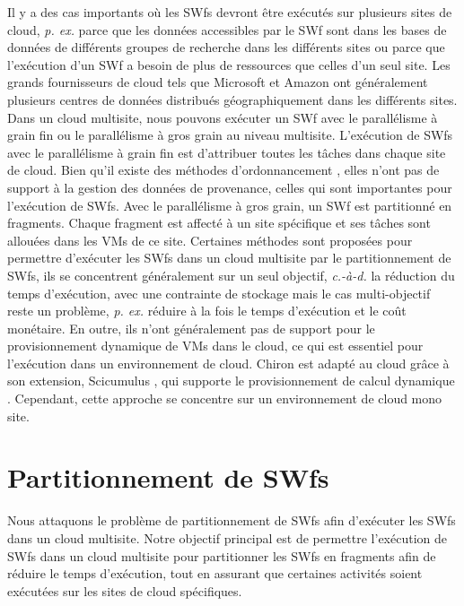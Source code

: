 Il y a des cas importants où les SWfs devront être exécutés sur plusieurs sites de cloud, \textit{p. ex.} parce que les données accessibles par le SWf sont dans les bases de données de différents groupes de recherche dans les différents sites ou parce que l'exécution d'un SWf a besoin de plus de ressources que celles d'un seul site. Les grands fournisseurs de cloud tels que Microsoft et Amazon ont généralement plusieurs centres de données distribués géographiquement dans les différents sites.
Dans un cloud multisite, nous pouvons exécuter un SWf avec le parallélisme à grain fin ou le parallélisme à gros grain au niveau multisite.
L'exécution de SWfs avec le parallélisme à grain fin est d'attribuer toutes les tâches dans chaque site de cloud.
Bien qu'il existe des méthodes d'ordonnancement \cite{Duan2014, Ostermann2009a}, elles n'ont pas de support à la gestion des données de provenance, celles qui sont importantes pour l'exécution de SWfs.
Avec le parallélisme à gros grain, un SWf est partitionné en fragments. Chaque fragment est affecté à un site spécifique et ses tâches sont allouées dans les VMs de ce site.
Certaines méthodes \cite{Chen2012a, Chen2013} sont proposées pour permettre d'exécuter les SWfs dans un cloud multisite par le partitionnement de SWfs, ils se concentrent généralement sur un seul objectif, \textit{c.-à-d.} la réduction du temps d'exécution, avec une contrainte de stockage mais le cas multi-objectif reste un problème, \textit{p. ex.} réduire à la fois le temps d'exécution et le coût monétaire. En outre, ils n'ont généralement pas de support pour le provisionnement dynamique de VMs dans le cloud, ce qui est essentiel pour l'exécution dans un environnement de cloud.
Chiron est adapté au cloud grâce à son extension, Scicumulus \cite{Oliveira2010, Oliveira2012}, qui supporte le provisionnement de calcul dynamique \cite{Oliveira2012a}. Cependant, cette approche se concentre sur un environnement de cloud mono site.

\section*{Partitionnement de SWfs}
Nous attaquons le problème de partitionnement de SWfs afin d'exécuter les SWfs dans un cloud multisite. Notre objectif principal est de permettre l'exécution de SWfs dans un cloud multisite pour partitionner les SWfs en fragments afin de réduire le temps d'exécution, tout en assurant que certaines activités soient exécutées sur les sites de cloud spécifiques.


